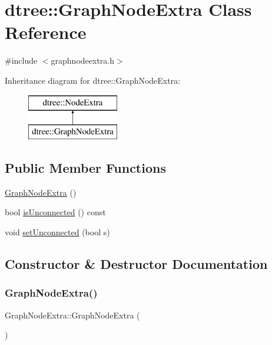 \hypertarget{classdtree_1_1_graph_node_extra}{}\section{dtree\+::Graph\+Node\+Extra Class Reference}
\label{classdtree_1_1_graph_node_extra}


{\ttfamily \#include $<$graphnodeextra.\+h$>$}

Inheritance diagram for dtree\+::Graph\+Node\+Extra\+:\begin{figure}[H]
\begin{center}
\leavevmode
\includegraphics[height=2.000000cm]{d4/d70/classdtree_1_1_graph_node_extra}
\end{center}
\end{figure}
\subsection*{Public Member Functions}
\begin{DoxyCompactItemize}
\item 
\mbox{\hyperlink{classdtree_1_1_graph_node_extra_aff195e394828c2b4c1fe671c10014662}{Graph\+Node\+Extra}} ()
\item 
bool \mbox{\hyperlink{classdtree_1_1_graph_node_extra_a0a06b2a50381261d6597d5c04068f0c9}{is\+Unconnected}} () const
\item 
void \mbox{\hyperlink{classdtree_1_1_graph_node_extra_a3507dfbbb8e8b85f304212d34b2d8727}{set\+Unconnected}} (bool s)
\end{DoxyCompactItemize}


\subsection{Constructor \& Destructor Documentation}
\mbox{\label{classdtree_1_1_graph_node_extra_aff195e394828c2b4c1fe671c10014662}} 
\subsubsection{\texorpdfstring{GraphNodeExtra()}{GraphNodeExtra()}}
{\footnotesize\ttfamily Graph\+Node\+Extra\+::\+Graph\+Node\+Extra (\begin{DoxyParamCaption}{ }\end{DoxyParamCaption})}



